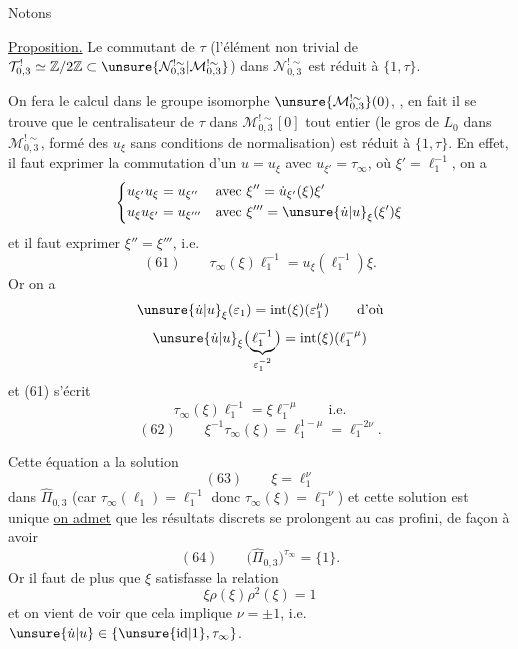 

Notons 

\uline{Proposition.} Le commutant de $\tau$ (l'élément
non trivial de $\mathcal T_{0,3}^{!}\simeq\mathbb Z/2\mathbb Z
\subset\unsure{\mathcal N_{0,3}^{!\sim}|\mathcal M_{0,3}^{!\sim}}$)
dans $\mathcal N_{0,3}^{!\sim}$ est réduit à $\{1,\tau\}$.


On fera le calcul dans le groupe isomorphe
$\unsure{\mathcal M_{0,3}^{!\sim}}(0)$,
,
en fait il se trouve que le centralisateur de $\tau$ dans
$\mathcal M_{0,3}^{!\sim}[0]$ tout entier
(le gros  de $L_0$ dans
$\mathcal M_{0,3}^{!\sim}$, formé des
$u_{\xi}$ sans conditions de normalisation)
est réduit à $\{1,\tau\}$.
En effet, il faut exprimer la commutation d'un
$u=u_{\xi}$ avec
$u_{\xi'}=\tau_\infty$,
où $\xi'=\ell_1^{-1}$, on a
\[
\left\{\begin{aligned}
u_{\xi'}u_{\xi}
&=u_{\xi''}
&&\text{avec }\xi''=
\dot u_{\xi'}(\xi)\xi'
\\
u_{\xi}u_{\xi'}
&=u_{\xi'''}
&&\text{avec }\xi'''=
\unsure{\dot u|u}_{\xi}(\xi')\xi
\end{aligned}\right.
\]
et il faut exprimer $\xi''=\xi'''$, i.e.
\[
(61)\qquad
\tau_\infty(\xi)\ell_1^{-1}
=u_{\xi}(\ell_1^{-1})\xi.
\]
Or on a
\[
\unsure{\dot u|u}_{\xi}(\varepsilon_1)
=\mathrm{int}(\xi)(\varepsilon_1^\mu)
\qquad\text{d'où}
\]
\[
\unsure{\dot u|u}_{\xi}
\bigl(\underbrace{\ell_1^{-1}}_{\varepsilon_1^{-2}}\bigr)
=\mathrm{int}(\xi)(\ell_1^{-\mu})
\]
et (61) s'écrit
\[
\tau_\infty(\xi)\ell_1^{-1}
=\xi\ell_1^{-\mu}\qquad\text{i.e.}
\]
\[
(62)\qquad
\xi^{-1}\tau_\infty(\xi)
=\ell_1^{1-\mu}=\ell_1^{-2\nu}.
\]


Cette équation a la solution
\[
(63)\qquad\xi=\ell_1^\nu
\]
dans $\widehat\Pi_{0,3}$ (car $\tau_\infty(\ell_1)=\ell_1^{-1}$
donc $\tau_\infty(\xi)=\ell_1^{-\nu}$)
et cette solution est unique \uline{ on admet}
que les résultats discrets se prolongent au cas profini,
de façon à avoir
\[
(64)\qquad\bigl(\widehat\Pi_{0,3}\bigr)^{\tau_\infty}=\{1\}.
\]
Or il faut de plus que $\xi$ satisfasse la relation
\[
\xi\rho(\xi)
\rho^2(\xi)=1
\]
et on vient de voir que cela implique
$\nu=\pm1$, i.e.
$\unsure{\dot u|u}\in\{\unsure{\mathrm{id}|1},\tau_\infty\}$.

